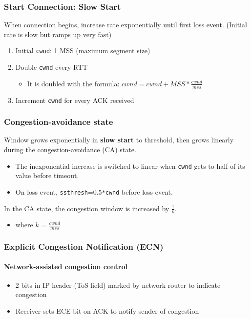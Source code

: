 \documentclass[a4paper]{article}
\begin{document}
\subsubsection{Start Connection: Slow Start}
When connection begins, increase rate exponentially until first loss event. (Initial rate is slow but ramps up very fast)
\begin{enumerate}
    \item Initial \texttt{cwnd}: 1 MSS (maximum segment size)
    \item Double \texttt{cwnd} every RTT
    \begin{itemize}
        \item It is doubled with the formula: $cwnd = cwnd + MSS * \displaystyle\frac{cwnd}{mss}$
    \end{itemize}
    \item Increment \texttt{cwnd} for every ACK received
\end{enumerate}

\subsubsection{Congestion-avoidance state}
Window grows exponentially in \textbf{slow start} to threshold, then grows linearly during the congestion-avoidance (CA) state. 
\begin{itemize}
    \item The inexponential increase is switched to linear when \texttt{cwnd} gets to half of its value before timeout.
    \item On loss event, \texttt{ssthresh}=0.5\texttt{*cwnd} before loss event.
\end{itemize}
In the CA state, the congestion window is increased by $\displaystyle\frac{1}{k}$.
\begin{itemize}
    \item where $k$ = $\displaystyle\frac{cwnd}{mss}$
\end{itemize}

\subsubsection{Explicit Congestion Notification (ECN)}
\paragraph{Network-assisted congestion control}
\begin{itemize}
    \item 2 bits in IP header (ToS field) marked by network router to indicate congestion
    \item Receiver sets ECE bit on ACK to notify sender of congestion
\end{itemize}
\end{document}
